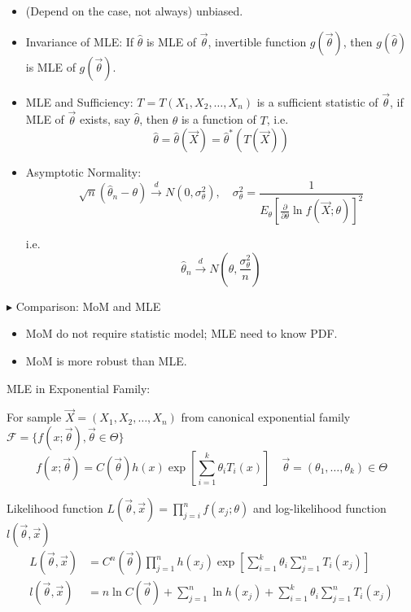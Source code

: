 \documentclass[11pt,a4paper]{ctexart}
\numberwithin{equation}{section}%
\newenvironment{point}{\raggedright$\blacktriangleright$}{}%
\begin{document}
        
    \begin{itemize}
        \item (Depend on the case, not always) unbiased.
        \item Invariance of MLE: If $\hat{\theta}$ is MLE of $\vec{\theta}$, invertible function $g(\vec{\theta})$, then $g(\hat{\theta})$ is MLE of $g(\vec{\theta})$.
        \item MLE and Sufficiency: $T=T(X_1,X_2,\ldots,X_n)$ is a sufficient statistic of $\vec{\theta}$, if MLE of $\vec{\theta}$ exists, say $\hat{\theta}$, then $\hat{\theta}$ is a function of $T$, i.e.
        \[  
            \hat{\theta}=\hat{\theta}(\vec{X})=\hat{\theta}^*(T(\vec{X}))    
        \]
        \item Asymptotic Normality: 
        \[
            \sqrt{n}(\hat{\theta}_n-\theta) \xrightarrow[]{d}N(0,\sigma^2_\theta),\quad \sigma^2_\theta=\frac{1}{E_\theta[\frac{\partial}{\partial\theta}\ln f(\vec{X};\theta)]^2}   
        \]

        i.e.
        \[
            \hat{\theta}_n\xrightarrow[]{d}N(\theta,\frac{\sigma^2_\theta}{n})    
        \]
        
    \end{itemize}

    \begin{point}
        Comparison: MoM and MLE
    \end{point}
    
        
    \begin{itemize}
        \item MoM do not require statistic model; MLE need to know PDF.
        \item MoM is more robust than MLE.
    \end{itemize}


    MLE in Exponential Family:

        For sample $\vec{X}=(X_1,X_2,\ldots,X_n)$ from canonical exponential family $\mathscr{F}=\{f(x;\vec{\theta}),\vec{\theta}\in\Theta\}$
        \[
            f(x;\vec{\theta})=C(\vec{\theta})h(x)\exp\left[\sum_{i=1}^k\theta_iT_i(x)\right]\quad \vec{\theta}=(\theta_1,\ldots,\theta_k)\in\Theta
        \]

        Likelihood function $L(\vec{\theta},\vec{x})=\prod_{j=i}^nf(x_j;\theta)$ and log-likelihood function $l(\vec{\theta},\vec{x})$
        \begin{align*}
            L(\vec{\theta},\vec{x})&=C^n(\vec{\theta})\prod_{j=1}^nh(x_j)\exp\left[\sum_{i=1}^k\theta_i\sum_{j=1}^n T_i(x_j)\right]\\
            l(\vec{\theta},\vec{x})&=n\ln C(\vec{\theta})+\sum_{j=1}^n\ln h(x_j)+\sum_{i=1}^k\theta_i\sum_{j=1}^nT_i(x_j)
        \end{align*}
\end{document}
